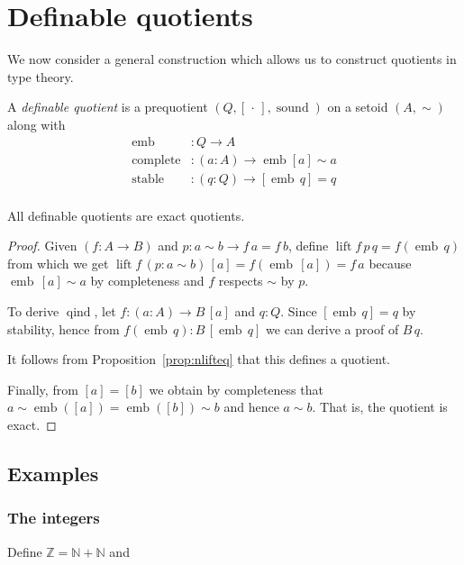 \documentclass[envcountsame]{llncs}
\newcommand{\N}{\mathbb{N}}
\newcommand{\Z}{\mathbb{Z}}
\newcommand{\dotph}{\,\cdot\,} %
\providecommand{\class}[1]{[#1]}
\DeclareMathOperator{\sound}{sound}
\DeclareMathOperator{\qind}{qind}
\DeclareMathOperator{\emb}{emb}
\DeclareMathOperator{\complete}{complete}
\DeclareMathOperator{\stable}{stable}
\DeclareMathOperator{\lift}{lift}
\renewcommand{\equiv}{=}
\begin{document}
\section{Definable quotients}\label{sec:defquotients}

We now consider a general construction which allows us to construct quotients in type theory.

\begin{definition}\label{def:defquotients}
A \emph{definable quotient} is a prequotient $(Q, \class{\dotph}, \sound)$ on a setoid $(A,\sim)$ along with
\begin{align*}
\emb &: Q \to A\\
\complete &: (a : A) \to \emb {\class a} \sim a\\
\stable &: (q:Q) \to \class{\emb\,q} \equiv q\\
\end{align*}
\end{definition}

\begin{proposition}\label{prop:definableimpliesexact}
All definable quotients are exact quotients.
\end{proposition}
\begin{proof}

Given $(f\colon A \to B)$ and $p : a\sim b \to f\,a \equiv f\,b$, define $\lift f\, p \,q = f (\emb\,q)$ from which we get $\lift f \,(p : a \sim b)\,\class a\equiv f(\emb\,\class a)\equiv f\,a$ because $\emb\,\class a\sim a$ by completeness and $f$ respects $\sim$ by $p$.

To derive $\qind$, let $f:(a\colon A)\to B\,\class a$ and $q:Q$. Since $ \class{\emb\,q} \equiv q$ by stability, hence from $f (\emb\,q):B\,\class{\emb\,q}$ we can derive a proof of $B\,q$.

It follows from Proposition~\ref{prop:nlifteq} that this defines a quotient.

Finally, from $\class a \equiv \class b$
we obtain by completeness that $a\sim\emb(\class a)\equiv\emb(\class b)\sim b$ and hence $a\sim b$. That is, the quotient is exact.
\end{proof}


\subsection{Examples}\label{sec:dquotients:examples}

\subsubsection*{The integers}
Define $\Z =\N + \N $ and
\end{document}
